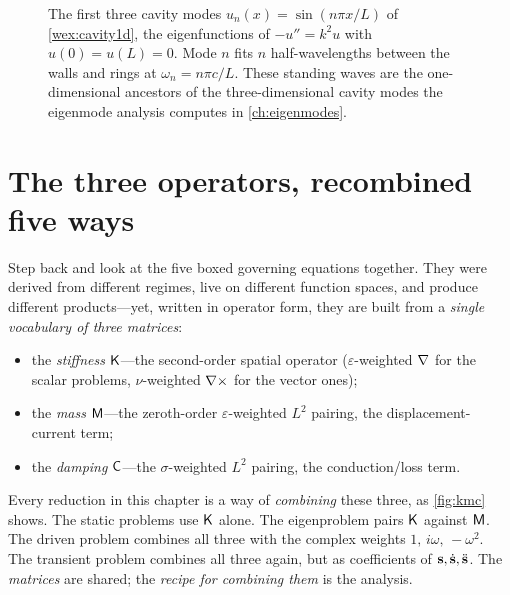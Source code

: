 \begin{figure}[t]
\centering
{}
\caption[Standing-wave modes of the one-dimensional cavity]{The first three
cavity modes $u_n(x)=\sin(n\pi x/L)$ of \cref{wex:cavity1d}, the eigenfunctions
of $-u''=k^2u$ with $u(0)=u(L)=0$. Mode $n$ fits $n$ half-wavelengths between the
walls and rings at $\omega_n=n\pi c/L$. These standing waves are the
one-dimensional ancestors of the three-dimensional cavity modes the eigenmode
analysis computes in \cref{ch:eigenmodes}.}
\label{fig:cavitymodes}
\end{figure}

\section{The three operators, recombined five ways}
\label{sec:threeoperators}

Step back and look at the five boxed governing equations together. They were
derived from different regimes, live on different function spaces, and produce
different products---yet, written in operator form, they are built from a
\emph{single vocabulary of three matrices}:
\begin{itemize}[nosep]
  \item the \emph{stiffness} $\mathsf{K}$---the second-order spatial operator
  ($\varepsilon$-weighted $\nabla$ for the scalar problems, $\nu$-weighted
  $\nabla\times$ for the vector ones);
  \item the \emph{mass} $\mathsf{M}$---the zeroth-order $\varepsilon$-weighted $L^2$
  pairing, the displacement-current term;
  \item the \emph{damping} $\mathsf{C}$---the $\sigma$-weighted $L^2$ pairing, the
  conduction/loss term.
\end{itemize}
Every reduction in this chapter is a way of \emph{combining} these three, as
\cref{fig:kmc} shows. The static problems use $\mathsf{K}$ alone. The eigenproblem
pairs $\mathsf{K}$ against $\mathsf{M}$. The driven problem combines all three with the
complex weights $1,\,i\omega,\,-\omega^2$. The transient problem combines all
three again, but as coefficients of $\mathbf{s},\dot{\mathbf{s}},\ddot{\mathbf{s}}$. The \emph{matrices}
are shared; the \emph{recipe for combining them} is the analysis.

